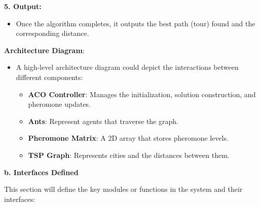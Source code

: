 \documentclass[
]{article}
\begin{document}
\textbf{5. Output:}

\begin{itemize}
\item
  Once the algorithm completes, it outputs the best path (tour) found
  and the corresponding distance.
\end{itemize}

\textbf{Architecture Diagram}:

\begin{itemize}
\item
  A high-level architecture diagram could depict the interactions
  between different components:

  \begin{itemize}
  \item
    \textbf{ACO Controller}: Manages the initialization, solution
    construction, and pheromone updates.
  \item
    \textbf{Ants}: Represent agents that traverse the graph.
  \item
    \textbf{Pheromone Matrix}: A 2D array that stores pheromone levels.
  \item
    \textbf{TSP Graph}: Represents cities and the distances between
    them.
  \end{itemize}
\end{itemize}

\textbf{b. Interfaces Defined}

This section will define the key modules or functions in the system and
their interfaces:
\end{document}
